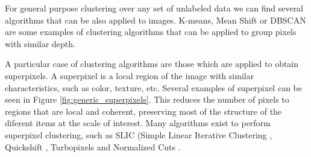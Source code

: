 For general purpose clustering over any set of unlabeled data we can find several algorithms that can be also applied to images. K-means, Mean Shift \cite{comaniciu2002mean} or DBSCAN \cite{ester1996density} are some examples of clustering algorithms that can be applied to group pixels with similar depth.

A particular case of clustering algorithms are those which are applied to obtain superpixels. A superpixel \cite{ren2003learning} is a local region of the image with similar characteristics, such as color, texture, etc. Several examples of superpixel can be seen in Figure \ref{fig:generic_superpixels}. This reduces the number of pixels to regions that are local and coherent, preserving most of the structure of the diferent items at the scale of interest. Many algorithms exist to perform superpixel clustering, such as SLIC (Simple Linear Iterative Clustering \cite{achanta2010slic}, Quickshift \cite{vedaldi2008quick}, Turbopixels \cite{levinshtein2009turbopixels} and Normalized Cuts \cite{mori2005guiding}.



